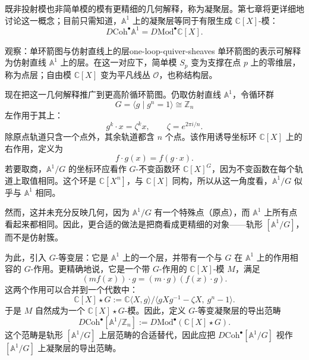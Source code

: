 既非投射模也非简单模的模有更精细的几何解释，称为凝聚层。第七章将更详细地讨论这一概念；目前只需知道，$\mathbb A^1$ 上的凝聚层等同于有限生成 $\mathbb C[X]$-模：
\[
  D\mathrm{Coh}^\bullet\mathbb A^1
  =D\mathrm{Mod}^\bullet\mathbb C[X].
\]

\begin{proposition}{观察：单环箭图与仿射直线上的层}{one-loop-quiver-sheaves}
单环箭图的表示可解释为仿射直线 $\mathbb A^1$ 上的层。在这一对应下，简单模 $S_p$ 变为支撑在点 $p$ 上的零维层，称为点层；自由模 $\mathbb C[X]$ 变为平凡线丛 $\mathcal O$，也称结构层。
\end{proposition}

现在把这一几何解释推广到更高阶循环箭图。仍取仿射直线 $\mathbb A^1$，令循环群
\[
  G=\langle g\mid g^n=1\rangle\cong\mathbb Z_n
\]
左作用于其上：
\[
  g^k\cdot x=\zeta^kx,
  \qquad \zeta=e^{2\pi i/n}.
\]
除原点轨道只含一个点外，其余轨道都含 $n$ 个点。该作用诱导坐标环 $\mathbb C[X]$ 上的右作用，定义为
\[
  f\cdot g(x)=f(g\cdot x).
\]
若要取商，$\mathbb A^1/G$ 的坐标环应看作 $G$-不变函数环 $\mathbb C[X]^G$，因为不变函数在每个轨道上取值相同。这个环是 $\mathbb C[X^n]$，与 $\mathbb C[X]$ 同构，所以从这一角度看，$\mathbb A^1/G$ 似乎与 $\mathbb A^1$ 相同。

然而，这并未充分反映几何，因为 $\mathbb A^1/G$ 有一个特殊点（原点），而 $\mathbb A^1$ 上所有点看起来都相同。因此，更合适的做法是把商看成更精细的对象——轨形 $[\mathbb A^1/G]$，而不是仿射簇。

为此，引入 $G$-等变层：它是 $\mathbb A^1$ 上的一个层，并带有一个与 $G$ 在 $\mathbb A^1$ 上的作用相容的 $G$-作用。更精确地说，它是一个带 $G$-作用的 $\mathbb C[X]$-模 $M$，满足
\[
  (mf(x))\cdot g=(m\cdot g)(f(x)\cdot g).
\]
这两个作用可以合并到一个代数中：
\[
  \mathbb C[X]\star G
  :=\mathbb C\langle X,g\rangle
  /\langle gXg^{-1}-\zeta X,\ g^n-1\rangle.
\]
于是 $M$ 自然成为一个 $\mathbb C[X]\star G$-模。因此，定义 $G$-等变凝聚层的导出范畴
\[
  D\mathrm{Coh}^\bullet[\mathbb A^1/\mathbb Z_n]
  :=D\mathrm{Mod}^\bullet(\mathbb C[X]\star G).
\]
这个范畴是轨形 $[\mathbb A^1/G]$ 上层范畴的合适替代，因此应把 $D\mathrm{Coh}^\bullet[\mathbb A^1/G]$ 视作 $[\mathbb A^1/G]$ 上凝聚层的导出范畴。

